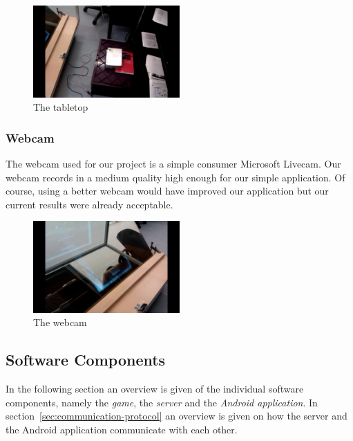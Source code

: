 \documentclass[a4paper,10pt]{article}
\begin{document}
	\begin{figure}[h!]
	\caption{The tabletop}
	\centering
	\includegraphics[width=0.5\textwidth]{images/beamer}
	\end{figure}

	\subsubsection{Webcam}
	The webcam used for our project is a simple consumer Microsoft Livecam. 
	Our webcam records in a medium quality high enough for our simple application. 
	Of course, using a better webcam would have improved our application but our current results were already acceptable. 

	\begin{figure}[h!]
	\caption{The webcam}
	\centering
	\includegraphics[width=0.5\textwidth]{images/webcam}
	\end{figure}

	\subsection{Software Components}
	\label{sec:software-components}
	In the following section an overview is given of the individual software components, namely the \emph{game}, the \emph{server} and the \emph{Android application}.
	In section~\ref{sec:communication-protocol} an overview is given on how the server and the Android application communicate with each other.

\end{document}
